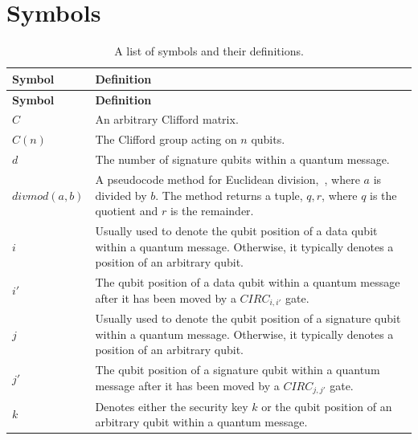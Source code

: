 \chapter{Symbols}
\label{sec:symbols}
\begin{xltabular}{\linewidth}{ l | X }
  \caption{A list of symbols and their definitions.} 
 \label{table:symboldescription}\\
 \hline \hline

\textbf{\normalsize Symbol} & \textbf{\normalsize Definition}  \\
 \hline 
\endfirsthead
 \hline \hline

\textbf{\normalsize Symbol} & \textbf{\normalsize Definition}  \\
 \hline 
\endhead

$C$ & An arbitrary Clifford matrix.
\\ \hline

$C(n)$ & The Clifford group acting on $n$ qubits.
\\ \hline

$d$ & The number of signature qubits within a quantum message.
\\ \hline

$\mathit{divmod}(a,b)$ & A pseudocode method for Euclidean division,~\cite{EuclideanDivisionWiki}, where $a$ is divided by $b$. The method returns a tuple, $q,r$, where $q$ is the quotient and $r$ is the remainder.
\\ \hline

$i$ & Usually used to denote the qubit position of a data qubit within a quantum message. Otherwise, it typically denotes a position of an arbitrary qubit.
\\ \hline

$i'$ & The qubit position of a data qubit within a quantum message after it has been moved by a $\mathit{CIRC}_{i,i'}$ gate.
\\ \hline

$j$ & Usually used to denote the qubit position of a signature qubit within a quantum message. Otherwise, it typically denotes a position of an arbitrary qubit.
\\ \hline

$j'$ & The qubit position of a signature qubit within a quantum message after it has been moved by a $\mathit{CIRC}_{j,j'}$ gate.
\\ \hline

$k$ & Denotes either the security key $k$ or the qubit position of an arbitrary qubit within a quantum message.
\\ \hline


\end{xltabular}
